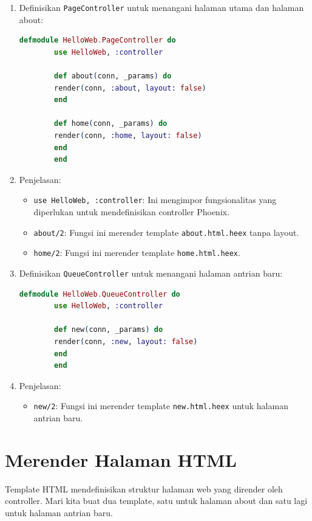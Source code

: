 \begin{enumerate}
	\item Definisikan \texttt{PageController} untuk menangani halaman utama dan halaman about:
	\begin{lstlisting}[language=Elixir]
		defmodule HelloWeb.PageController do
		use HelloWeb, :controller
		
		def about(conn, _params) do
		render(conn, :about, layout: false)
		end
		
		def home(conn, _params) do
		render(conn, :home, layout: false)
		end
		end
	\end{lstlisting}
	
	\item Penjelasan:
	\begin{itemize}
		\item \texttt{use HelloWeb, :controller}: Ini mengimpor fungsionalitas yang diperlukan untuk mendefinisikan controller Phoenix.
		\item \texttt{about/2}: Fungsi ini merender template \texttt{about.html.heex} tanpa layout.
		\item \texttt{home/2}: Fungsi ini merender template \texttt{home.html.heex}.
	\end{itemize}
	
	\item Definisikan \texttt{QueueController} untuk menangani halaman antrian baru:
	\begin{lstlisting}[language=Elixir]
		defmodule HelloWeb.QueueController do
		use HelloWeb, :controller
		
		def new(conn, _params) do
		render(conn, :new, layout: false)
		end
		end
	\end{lstlisting}
	
	\item Penjelasan:
	\begin{itemize}
		\item \texttt{new/2}: Fungsi ini merender template \texttt{new.html.heex} untuk halaman antrian baru.
	\end{itemize}
\end{enumerate}

\section{Merender Halaman HTML}
Template HTML mendefinisikan struktur halaman web yang dirender oleh controller. Mari kita buat dua template, satu untuk halaman about dan satu lagi untuk halaman antrian baru.

